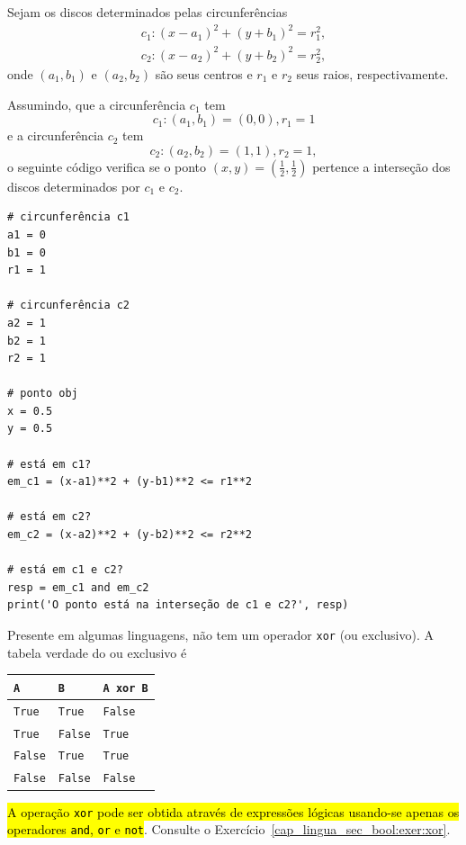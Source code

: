 \begin{ex}
  Sejam os discos determinados pelas circunferências
  \begin{gather}
    c_1: (x - a_1)^2 + (y + b_1)^2 = r_1^2,\\
    c_2: (x - a_2)^2 + (y + b_2)^2 = r_2^2,
  \end{gather}
  onde $(a_1, b_1)$ e $(a_2, b_2)$ são seus centros e $r_1$ e $r_2$ seus raios, respectivamente.

  Assumindo, que a circunferência $c_1$ tem
  \begin{equation}
    c_1: (a_1, b_1) = (0, 0), r_1 = 1
  \end{equation}
  e a circunferência $c_2$ tem
  \begin{equation}
    c_2: (a_2, b_2) = (1, 1), r_2 = 1,
  \end{equation}
  o seguinte código verifica se o ponto $(x, y) = \left(\frac{1}{2}, \frac{1}{2}\right)$ pertence a interseção dos discos determinados por $c_1$ e $c_2$.

\begin{lstlisting}
# circunferência c1
a1 = 0
b1 = 0
r1 = 1

# circunferência c2
a2 = 1
b2 = 1
r2 = 1

# ponto obj
x = 0.5
y = 0.5

# está em c1?
em_c1 = (x-a1)**2 + (y-b1)**2 <= r1**2

# está em c2?
em_c2 = (x-a2)**2 + (y-b2)**2 <= r2**2

# está em c1 e c2?
resp = em_c1 and em_c2
print('O ponto está na interseção de c1 e c2?', resp)
\end{lstlisting}
\end{ex}


\begin{obs}\label{cap_lingua_sec_bool:obs:xor}
  Presente em algumas linguagens, {\python} não tem um operador \lstinline+xor+ (ou exclusivo). A tabela verdade do ou exclusivo é
  \begin{center}
    \begin{tabular}[H]{ll|l}
      {\lstinline+A+}     & {\lstinline+B+}     & {\lstinline+A xor B+} \\\hline
      {\lstinline+True+}  & {\lstinline+True+}  & {\lstinline+False+}   \\
      {\lstinline+True+}  & {\lstinline+False+} & {\lstinline+True+}    \\
      {\lstinline+False+} & {\lstinline+True+}  & {\lstinline+True+}    \\
      {\lstinline+False+} & {\lstinline+False+} & {\lstinline+False+}   \\\hline    
    \end{tabular}
  \end{center}
  \hl{A operação \texttt{xor} pode ser obtida através de expressões lógicas usando-se apenas os operadores \texttt{and}, \texttt{or} e \texttt{not}}. Consulte o Exercício~\ref{cap_lingua_sec_bool:exer:xor}.
\end{obs}

